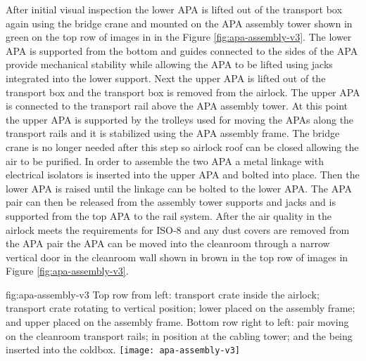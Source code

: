 After initial visual inspection the lower APA is lifted out of the transport box again using the bridge crane and mounted on the APA assembly tower shown in green on the top row of images in in the Figure \ref{fig:apa-assembly-v3}. The  lower APA is supported from the bottom and guides connected to the sides of the APA provide mechanical stability while allowing the APA to be lifted using jacks integrated into the lower support. Next the upper APA is lifted out of the transport box and the transport box is removed from the airlock. The upper APA is connected to the transport rail above the APA assembly tower. At this point the upper APA is supported by the trolleys used for moving the APAs along the transport rails and it is stabilized using the APA assembly frame. The bridge crane is no longer needed after this step so airlock roof can be closed allowing the air to be purified. In order to assemble the two APA a metal linkage with electrical isolators is inserted into the upper APA and bolted into place. Then the lower APA is raised until the linkage can be bolted to the lower APA.  The APA pair can then be released from the assembly tower supports and jacks and is supported from the top APA to the rail system.
After the air quality in the airlock meets the requirements for ISO-8 and any dust covers are removed from the APA pair the APA can be moved into the cleanroom through a narrow vertical door in the cleanroom wall shown in brown in the top row of images in Figure \ref{fig:apa-assembly-v3}.


\begin{dunefigure}{fig:apa-assembly-v3}
  {Top row from left:   transport crate inside the airlock;  transport crate rotating to vertical position;  lower  placed on the  assembly frame; and upper  placed on the assembly frame. Bottom row right to left:  pair moving on the cleanroom transport rails;  in  position at the cabling tower; and the  being inserted into the coldbox.}
\texttt{[image: apa-assembly-v3]}

\end{dunefigure}

